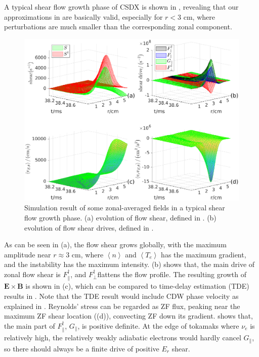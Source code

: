 \documentclass[aps,pre,twocolumn,superscriptaddress]{revtex4-1}
\begin{document}
A typical shear flow growth phase of CSDX is shown in , revealing that our approximations in  are basically valid, especially for $r<3$ cm, where perturbations are much smaller than the corresponding zonal component.
\begin{figure}[htb]
	\includegraphics[width=3.375 in]{acc_den_drive.eps}
	\caption{
		Simulation result of some zonal-averaged fields in a typical shear flow growth phase. (a) evolution of flow shear, defined in . (b) evolution of flow shear drives, defined in .
		\label{fig:acc_den_drive}	
	}
\end{figure}


As can be seen in (a), the flow shear grows globally, with the maximum amplitude near $r\approx 3$ cm, where $\left<n\right>$ and $\left<T_{e}\right>$ has the maximum gradient, and the instability has the maximum intensity. (b) shows that, the main drive of zonal flow shear is $F_{\parallel}^{\dagger}$, and $F_{\perp}^{\dagger}$flattens the flow profile. The resulting growth of $\bm{E}\times\bm{B}$ is shown in (c), which can be compared to time-delay estimation (TDE) results in \cite{PhysRevLett.104.065002,doi:10.1063/1.3322823}. Note that the TDE result would include CDW phase velocity as explained in \cite{PhysRevE.100.033212}. Reynolds' stress can be regarded as ZF flux, peaking near the maximum ZF shear location ((d)), convecting ZF down its gradient.  shows that, the main part of $F_{\parallel}^{\dagger}$, $G_{\parallel}$, is positive definite. At the edge of tokamaks where $\nu_{e}$ is relatively high, the relatively weakly adiabatic electrons would hardly cancel $G_{\parallel}$, so there should always be a finite drive of positive $E_{r}$ shear. 
\end{document}
